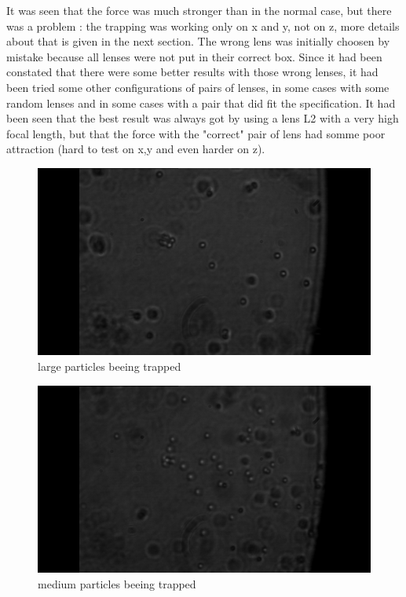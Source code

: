 \documentclass[a4paper,12pt,twoside]{article}	%
\begin{document}
It was seen that the force was much stronger than in the normal case, but there was a problem : the trapping was working only on x and y, not on z, more details about that is given in the next section. The wrong lens was initially choosen by mistake because all lenses were not put in their correct box. Since it had been constated that there were some better results with those wrong lenses, it had been tried some other configurations of pairs of lenses, in some cases with some random lenses and in some cases with a pair that did fit the specification. It had been seen that the best result was always got by using a lens L2 with a very high focal length, but that the force with the "correct" pair of lens had somme poor attraction (hard to test on x,y and even harder on z). 


\begin{figure}
	\begin{center}
	\includegraphics[width=0.7\linewidth,angle=0]{./figures/gros_trap}
	\caption{large particles beeing trapped} \label{fig:gros_trap}
	\end{center}
\end{figure}
\begin{figure}
	\begin{center}
	\includegraphics[width=0.7\linewidth,angle=0]{./figures/moyen_trap}
	\caption{medium particles beeing trapped} \label{fig:gros_trap}
	\end{center}
\end{figure}
\end{document}
